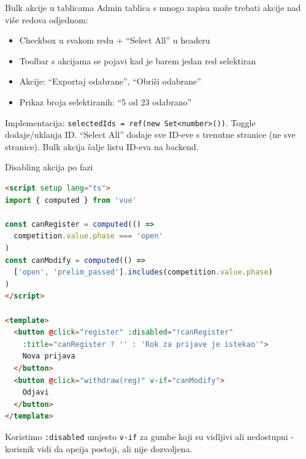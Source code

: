 \begin{frame}{Bulk akcije u tablicama}
Admin tablica s mnogo zapisa može trebati akcije nad više redova odjednom:

\vspace{0.4em}
\begin{itemize}
  \item Checkbox u svakom redu + \enquote{Select All} u headeru
  \item Toolbar s akcijama se pojavi kad je barem jedan red selektiran
  \item Akcije: \enquote{Exportaj odabrane}, \enquote{Obriši odabrane}
  \item Prikaz broja selektiranih: \enquote{5 od 23 odabrano}
\end{itemize}

\vspace{0.6em}
Implementacija: \texttt{selectedIds = ref(new Set<number>())}. Toggle dodaje/uklanja ID. \enquote{Select All} dodaje sve ID-eve s trenutne stranice (ne sve stranice). Bulk akcija šalje listu ID-eva na backend.
\end{frame}

\begin{frame}[fragile,shrink=5]{Disabling akcija po fazi}
\begin{lstlisting}[language=html]
<script setup lang="ts">
import { computed } from 'vue'

const canRegister = computed(() =>
  competition.value.phase === 'open'
)
const canModify = computed(() =>
  ['open', 'prelim_passed'].includes(competition.value.phase)
)
</script>

<template>
  <button @click="register" :disabled="!canRegister"
    :title="canRegister ? '' : 'Rok za prijave je istekao'">
    Nova prijava
  </button>
  <button @click="withdraw(reg)" v-if="canModify">
    Odjavi
  </button>
</template>
\end{lstlisting}

\vspace{0.4em}
Koristimo \texttt{:disabled} umjesto \texttt{v-if} za gumbe koji su vidljivi ali nedostupni - korisnik vidi da opcija postoji, ali nije dozvoljena.
\end{frame}

